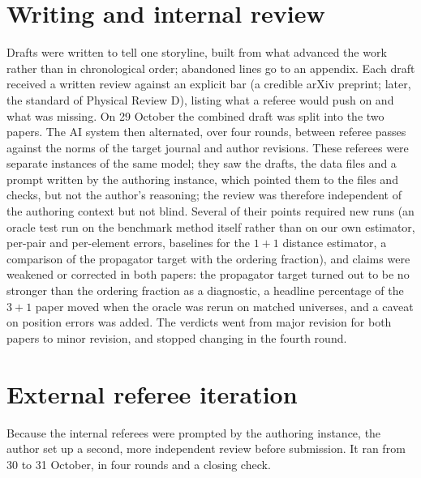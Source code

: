 \documentclass[11pt,a4paper]{article}
\begin{document}
\section{Writing and internal review}
Drafts were written to tell one storyline, built from what advanced the work rather than in chronological order; abandoned lines go to an appendix. Each draft received a written review against an explicit bar (a credible arXiv preprint; later, the standard of Physical Review D), listing what a referee would push on and what was missing. On 29 October the combined draft was split into the two papers. The AI system then alternated, over four rounds, between referee passes against the norms of the target journal and author revisions. These referees were separate instances of the same model; they saw the drafts, the data files and a prompt written by the authoring instance, which pointed them to the files and checks, but not the author's reasoning; the review was therefore independent of the authoring context but not blind. Several of their points required new runs (an oracle test run on the benchmark method itself rather than on our own estimator, per-pair and per-element errors, baselines for the $1+1$ distance estimator, a comparison of the propagator target with the ordering fraction), and claims were weakened or corrected in both papers: the propagator target turned out to be no stronger than the ordering fraction as a diagnostic, a headline percentage of the $3+1$ paper moved when the oracle was rerun on matched universes, and a caveat on position errors was added. The verdicts went from major revision for both papers to minor revision, and stopped changing in the fourth round.

\section{External referee iteration}\label{sec:external}
Because the internal referees were prompted by the authoring instance, the author set up a second, more independent review before submission. It ran from 30 to 31 October, in four rounds and a closing check.
\end{document}
